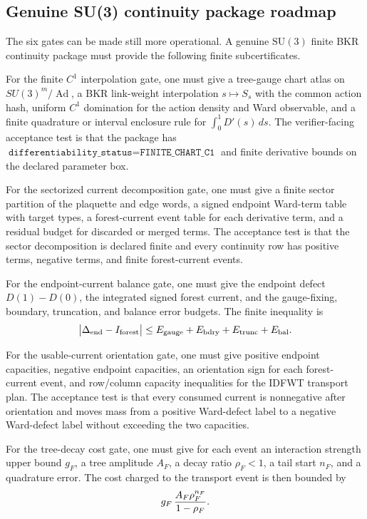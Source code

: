 \subsection{Genuine SU(3) continuity package roadmap}
The six gates can be made still more operational.  A genuine
\(\mathrm{SU}(3)\) finite BKR continuity package must provide the following
finite subcertificates.

For the finite \(C^1\) interpolation gate, one must give a tree-gauge chart
atlas on \(SU(3)^m/\operatorname{Ad}\), a BKR link-weight interpolation
\(s\mapsto S_s\) with the common action hash, uniform \(C^1\) domination for
the action density and Ward observable, and a finite quadrature or interval
enclosure rule for \(\int_0^1D'(s)\,ds\).  The verifier-facing acceptance test
is that the package has
\(\texttt{differentiability\_status}=\texttt{FINITE\_CHART\_C1}\) and finite
derivative bounds on the declared parameter box.

For the sectorized current decomposition gate, one must give a finite sector
partition of the plaquette and edge words, a signed endpoint Ward-term table
with target types, a forest-current event table for each derivative term, and
a residual budget for discarded or merged terms.  The acceptance test is that
the sector decomposition is declared finite and every continuity row has
positive terms, negative terms, and finite forest-current events.

For the endpoint-current balance gate, one must give the endpoint defect
\(D(1)-D(0)\), the integrated signed forest current, and the gauge-fixing,
boundary, truncation, and balance error budgets.  The finite inequality is
\[
  \bigl|\Delta_{\rm end}-I_{\rm forest}\bigr|
  \le
  E_{\rm gauge}+E_{\rm bdry}+E_{\rm trunc}+E_{\rm bal}.
\]

For the usable-current orientation gate, one must give positive endpoint
capacities, negative endpoint capacities, an orientation sign for each
forest-current event, and row/column capacity inequalities for the IDFWT
transport plan.  The acceptance test is that every consumed current is
nonnegative after orientation and moves mass from a positive Ward-defect label
to a negative Ward-defect label without exceeding the two capacities.

For the tree-decay cost gate, one must give for each event an interaction
strength upper bound \(g_F\), a tree amplitude \(A_F\), a decay ratio
\(\rho_F<1\), a tail start \(n_F\), and a quadrature error.  The cost charged
to the transport event is then bounded by
\[
  g_F\,{A_F\rho_F^{n_F}\over 1-\rho_F}.
\]

